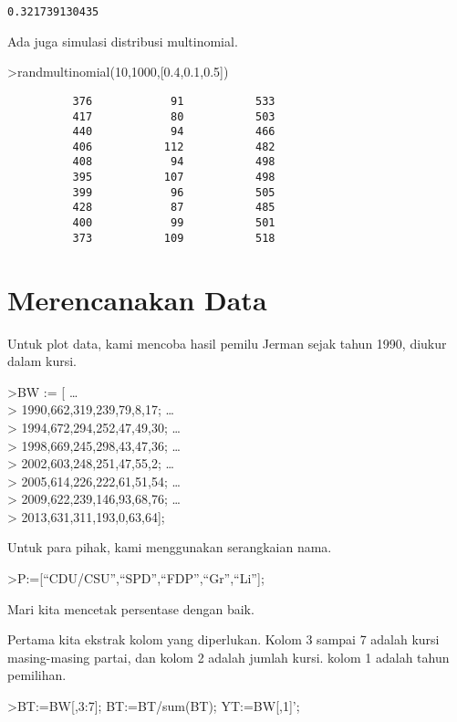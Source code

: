 \documentclass[
]{book}
\begin{document}
\begin{verbatim}
0.321739130435
\end{verbatim}

Ada juga simulasi distribusi multinomial.

\textgreater randmultinomial(10,1000,{[}0.4,0.1,0.5{]})

\begin{verbatim}
          376            91           533 
          417            80           503 
          440            94           466 
          406           112           482 
          408            94           498 
          395           107           498 
          399            96           505 
          428            87           485 
          400            99           501 
          373           109           518 
\end{verbatim}

\chapter{Merencanakan Data}\label{merencanakan-data}

Untuk plot data, kami mencoba hasil pemilu Jerman sejak tahun 1990, diukur dalam kursi.

\textgreater BW := {[} \ldots{}\\
\textgreater{} 1990,662,319,239,79,8,17; \ldots{}\\
\textgreater{} 1994,672,294,252,47,49,30; \ldots{}\\
\textgreater{} 1998,669,245,298,43,47,36; \ldots{}\\
\textgreater{} 2002,603,248,251,47,55,2; \ldots{}\\
\textgreater{} 2005,614,226,222,61,51,54; \ldots{}\\
\textgreater{} 2009,622,239,146,93,68,76; \ldots{}\\
\textgreater{} 2013,631,311,193,0,63,64{]};

Untuk para pihak, kami menggunakan serangkaian nama.

\textgreater P:={[}``CDU/CSU'',``SPD'',``FDP'',``Gr'',``Li''{]};

Mari kita mencetak persentase dengan baik.

Pertama kita ekstrak kolom yang diperlukan. Kolom 3 sampai 7 adalah kursi masing-masing partai, dan kolom 2 adalah jumlah kursi. kolom 1 adalah tahun pemilihan.

\textgreater BT:=BW{[},3:7{]}; BT:=BT/sum(BT); YT:=BW{[},1{]}';
\end{document}
